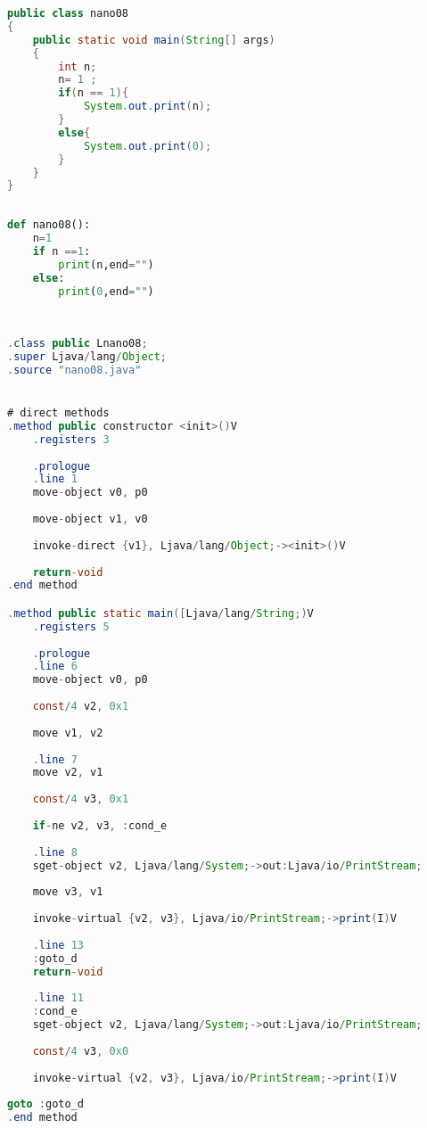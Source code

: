 \documentclass[hidelinks,12pt]{article}
\begin{document}
	\begin{lstlisting}[caption=Código em Java,language=java]
public class nano08
{
	public static void main(String[] args)
	{
		int n;
		n= 1 ;
		if(n == 1){
			System.out.print(n);
		}
		else{
			System.out.print(0);
		}
	}
}	
	
	\end{lstlisting}
	
	\begin{lstlisting}[caption=Código em python,language=Python]
def nano08():
	n=1
	if n ==1:
		print(n,end="")
	else:
		print(0,end="")
	
	
	\end{lstlisting}
	
	\begin{lstlisting}[caption=Smali resultante do .java,language=java]
.class public Lnano08;
.super Ljava/lang/Object;
.source "nano08.java"


# direct methods
.method public constructor <init>()V
	.registers 3
	
	.prologue
	.line 1
	move-object v0, p0
	
	move-object v1, v0
	
	invoke-direct {v1}, Ljava/lang/Object;-><init>()V
	
	return-void
.end method

.method public static main([Ljava/lang/String;)V
	.registers 5
	
	.prologue
	.line 6
	move-object v0, p0
	
	const/4 v2, 0x1
	
	move v1, v2
	
	.line 7
	move v2, v1
	
	const/4 v3, 0x1
	
	if-ne v2, v3, :cond_e
	
	.line 8
	sget-object v2, Ljava/lang/System;->out:Ljava/io/PrintStream;
	
	move v3, v1
	
	invoke-virtual {v2, v3}, Ljava/io/PrintStream;->print(I)V
	
	.line 13
	:goto_d
	return-void
	
	.line 11
	:cond_e
	sget-object v2, Ljava/lang/System;->out:Ljava/io/PrintStream;
	
	const/4 v3, 0x0
	
	invoke-virtual {v2, v3}, Ljava/io/PrintStream;->print(I)V
	
goto :goto_d
.end method	
	
	
	\end{lstlisting}
	
\end{document}
